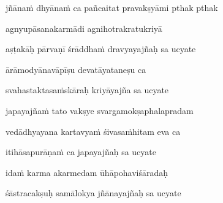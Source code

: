 jñānaṁ dhyānaṁ ca pañcaitat pravakṣyāmi pthak pthak \veg\dontdisplaylinenum
{}



agnyupāsanakarmādi agnihotrakratukriyā\thinspace{\dandab} \dontdisplaylinenum
{}

aṣṭakāḥ pārvaṇī śrāddhaṁ dravyayajñaḥ sa ucyate \veg\dontdisplaylinenum
{}



ārāmodyānavāpīṣu devatāyataneṣu ca\thinspace{\dandab} \dontdisplaylinenum
{}

svahastaktasaṁskāraḥ kriyāyajña sa ucyate \veg\dontdisplaylinenum
{}



japayajñaṁ tato vakṣye svargamokṣaphalapradam\thinspace{\dandab} \dontdisplaylinenum
{}

vedādhyayana kartavyaṁ śivasaṁhitam eva ca \danda\dontdisplaylinenum
{}

itihāsapurāṇaṁ ca japayajñaḥ sa ucyate \veg\dontdisplaylinenum
{}



idaṁ karma akarmedam ūhāpohaviśāradaḥ\thinspace{\dandab} \dontdisplaylinenum
{}

śāstracakṣuḥ samālokya jñānayajñaḥ sa ucyate \danda\dontdisplaylinenum
{}

